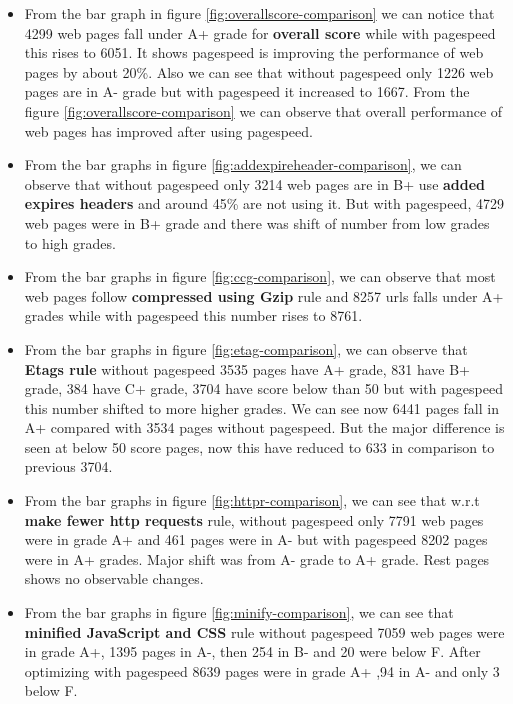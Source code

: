 \documentclass[conference]{IEEEtran}
\begin{document}
\begin{itemize}
\item From the bar graph in figure \ref{fig:overallscore-comparison} we can notice that 4299 web pages fall under
A+ grade for \textbf{overall score} while with pagespeed this rises to 6051. It
shows pagespeed is improving the performance of web pages by about 20\%. Also
we can see that without pagespeed only 1226 web pages are in A- grade but with
pagespeed it increased to 1667. From the figure \ref{fig:overallscore-comparison} we can observe that overall
performance of web pages has improved after using pagespeed.

\item From the bar graphs in figure \ref{fig:addexpireheader-comparison}, we can observe that without pagespeed only 3214
web pages are in B+  use \textbf{added expires headers} and around
45\% are not using it. But with pagespeed, 4729 web pages were in B+ grade and
there was shift of number from low grades to high grades.

\item From the bar graphs in figure \ref{fig:ccg-comparison}, we can observe that most web pages follow \textbf{compressed
using Gzip} rule and 8257 urls falls under A+ grades while with pagespeed this number rises to 8761.

\item From the bar graphs in figure \ref{fig:etag-comparison},
we can observe that \textbf{Etags rule} without pagespeed
3535 pages have A+ grade, 831 have B+ grade, 384 have C+ grade, 3704 have score
below than 50 but with pagespeed this number shifted to more higher grades. We can
see now 6441 pages fall in  A+ compared with 3534 pages without pagespeed. But the major difference is seen
at below 50 score pages, now this have reduced to 633 in comparison to previous
3704.

\item From the bar graphs in figure \ref{fig:httpr-comparison}, we can see that w.r.t \textbf{make fewer http
requests} rule, without pagespeed only 7791 web pages were in grade A+ and 461 pages
were in A- but with pagespeed 8202 pages were in A+ grades. Major shift was from 
A- grade to A+ grade. Rest pages shows no observable changes.

\item From the bar graphs in figure \ref{fig:minify-comparison}, we can see that \textbf{minified JavaScript and CSS} rule
without pagespeed 7059 web pages were in grade A+, 1395 pages in A-, then 254 in
B- and 20 were below F. After optimizing with pagespeed 8639 pages were in grade A+ ,94 in A- and only 3 below F.
\end{itemize}
\end{document}
